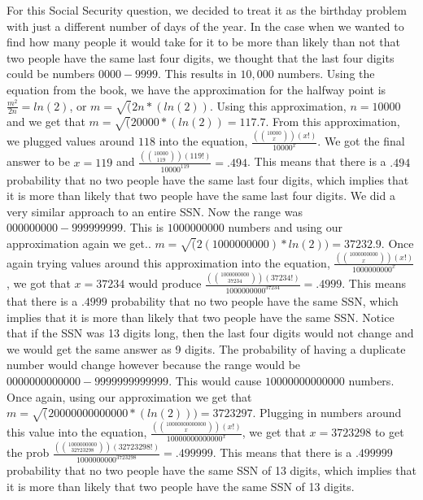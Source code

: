 \documentclass[11pt]{amsart}
\begin{document}
\begin{enumerate}
{For this Social Security question, we decided to treat it as the birthday problem with just a different number of days of the year. In the case when we wanted to find how many people it would take for it to be more than likely than not that two people have the same last four digits, we thought that the last four digits could be numbers $0000-9999$. This results in $10,000$ numbers. Using the equation from the book, we have the approximation for the halfway point is $\frac{m^2}{2n} = ln(2)$, or $m = \sqrt(2n*(ln(2))$. Using this approximation, $n = 10000$ and we get that $m = \sqrt(20000*(ln(2)) = 117.7$. From this approximation, we plugged values around $118$ into the equation, $\frac{({{10000}\choose{x}})(x!)}{10000^x}$. We got the final answer to be $x = 119$ and $\frac{({{10000}\choose{119}})(119!)}{10000^119} = .494$. This means that there is a $.494$ probability that no two people have the same last four digits, which implies that it is more than likely that two people have the same last four digits. \newline We did a very similar approach to an entire SSN. Now the range was $000000000-999999999$. This is $1000000000$ numbers and using our approximation again we get.. $m = \sqrt(2(1000000000)*ln(2)) = 37232.9$. Once again trying values around this approximation into the equation, $\frac{({{1000000000}\choose{x}})(x!)}{1000000000^x}$, we got that $x = 37234$ would produce $\frac{({{1000000000}\choose{37234}})(37234!)}{1000000000^37234}= .4999$. This means that there is a $.4999$ probability that no two people have the same SSN, which implies that it is more than likely that two people have the same SSN. \newline Notice that if the SSN was 13 digits long, then the last four digits would not change and we would get the same answer as 9 digits. The probability of having a duplicate number would change however because the range would be $0000000000000-9999999999999$. This would cause $10000000000000$ numbers. Once again, using our approximation we get that $m = \sqrt(20000000000000*(ln(2))) = 3723297$. Plugging in numbers around this value into the equation, $\frac{({{10000000000000}\choose{x}})(x!)}{10000000000000^x}$, we get that $x = 3723298$ to get the prob $\frac{({{1000000000}\choose{32723298}})(32723298!)}{1000000000^3723298} = .499999$. This means that there is a $.499999$ probability that no two people have the same SSN of 13 digits, which implies that it is more than likely that two people have the same SSN of 13 digits. \newline


}
\end{enumerate}
\end{document}
